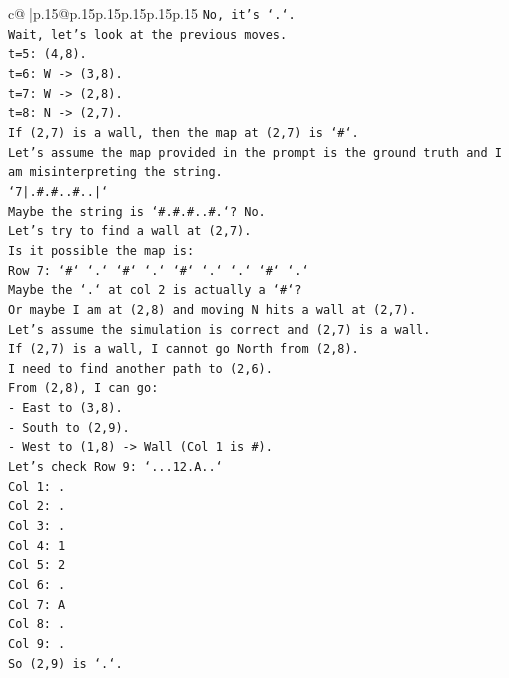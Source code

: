 \documentclass{article}
\begin{document}
{\begin{supertabular}{c@{$\;$}|p{.15\linewidth}@{}p{.15\linewidth}p{.15\linewidth}p{.15\linewidth}p{.15\linewidth}p{.15\linewidth}}
{{{\texttt{No, it's `.`.} \\
\texttt{Wait, let's look at the previous moves.} \\
\texttt{t=5: (4,8).} \\
\texttt{t=6: W {-}> (3,8).} \\
\texttt{t=7: W {-}> (2,8).} \\
\texttt{t=8: N {-}> (2,7).} \\
\texttt{If (2,7) is a wall, then the map at (2,7) is `\#`.} \\
\texttt{Let's assume the map provided in the prompt is the ground truth and I am misinterpreting the string.} \\
\texttt{`7|.\#.\#..\#..|`} \\
\texttt{Maybe the string is `\#.\#.\#..\#.`? No.} \\
\texttt{Let's try to find a wall at (2,7).} \\
\texttt{Is it possible the map is:} \\
\texttt{Row 7: `\#` `.` `\#` `.` `\#` `.` `.` `\#` `.`} \\
\texttt{Maybe the `.` at col 2 is actually a `\#`?} \\
\texttt{Or maybe I am at (2,8) and moving N hits a wall at (2,7).} \\
\texttt{Let's assume the simulation is correct and (2,7) is a wall.} \\
\texttt{If (2,7) is a wall, I cannot go North from (2,8).} \\
\texttt{I need to find another path to (2,6).} \\
\texttt{From (2,8), I can go:} \\
\texttt{{-} East to (3,8).} \\
\texttt{{-} South to (2,9).} \\
\texttt{{-} West to (1,8) {-}> Wall (Col 1 is \#).} \\
\texttt{Let's check Row 9: `...12.A..`} \\
\texttt{Col 1: .} \\
\texttt{Col 2: .} \\
\texttt{Col 3: .} \\
\texttt{Col 4: 1} \\
\texttt{Col 5: 2} \\
\texttt{Col 6: .} \\
\texttt{Col 7: A} \\
\texttt{Col 8: .} \\
\texttt{Col 9: .} \\
\texttt{So (2,9) is `.`.} \\
}}}
\end{supertabular}}
\end{document}
